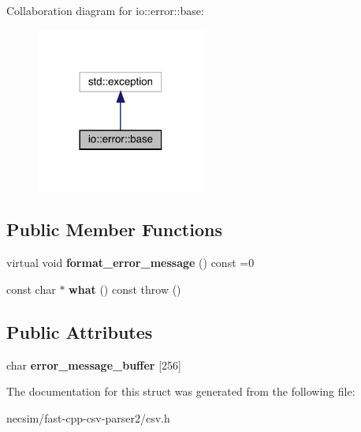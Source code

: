 Collaboration diagram for io\+:\+:error\+:\+:base\+:
\nopagebreak
\begin{figure}[H]
\begin{center}
\leavevmode
\includegraphics[width=158pt]{structio_1_1error_1_1base__coll__graph}
\end{center}
\end{figure}
\subsection*{Public Member Functions}
\begin{DoxyCompactItemize}
\item 
virtual void {\bfseries format\+\_\+error\+\_\+message} () const  =0\hypertarget{structio_1_1error_1_1base_aa993f14edd81ef5a6a3bf32381d0d9a3}{}\label{structio_1_1error_1_1base_aa993f14edd81ef5a6a3bf32381d0d9a3}

\item 
const char $\ast$ {\bfseries what} () const   throw ()\hypertarget{structio_1_1error_1_1base_ad99d4a2459e51ce2c24707569c4a0df6}{}\label{structio_1_1error_1_1base_ad99d4a2459e51ce2c24707569c4a0df6}

\end{DoxyCompactItemize}
\subsection*{Public Attributes}
\begin{DoxyCompactItemize}
\item 
char {\bfseries error\+\_\+message\+\_\+buffer} \mbox{[}256\mbox{]}\hypertarget{structio_1_1error_1_1base_a8e38f86a7afea1f0c6e6cac0c548d6f2}{}\label{structio_1_1error_1_1base_a8e38f86a7afea1f0c6e6cac0c548d6f2}

\end{DoxyCompactItemize}


The documentation for this struct was generated from the following file\+:\begin{DoxyCompactItemize}
\item 
necsim/fast-\/cpp-\/csv-\/parser2/csv.\+h\end{DoxyCompactItemize}
